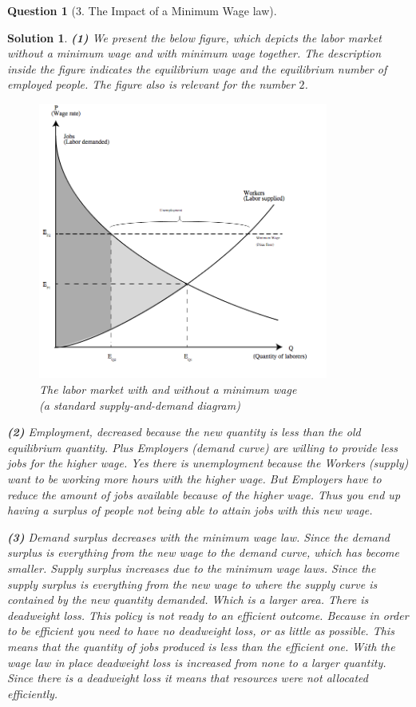 \documentclass{article} %
\theoremstyle{quest}
\newtheorem*{question}{Question}
\newtheorem*{solution}{Solution}
\begin{document}
\pagebreak

\begin{question}[3. The Impact of a Minimum Wage law]
\end{question}
\begin{solution}
\textbf{(1)}
We present the below figure, which depicts the labor market without a minimum wage and with minimum
wage together. The description inside the figure indicates the equilibrium wage and the equilibrium
number of employed people. The figure also is relevant for the number $2$.
\begin{figure}[h!]
  \caption{The labor market with and without a minimum wage \\ (a standard supply-and-demand diagram)}
    \centering
  \includegraphics[width=0.85\textwidth]{graph3.jpg}
\end{figure}
\smallskip

\textbf{(2)}
Employment, decreased because the new quantity is less than the old equilibrium quantity. Plus Employers (demand curve) are willing to provide less jobs for the higher wage. Yes there is unemployment because the Workers (supply) want to be working more hours with the higher wage. But Employers have to reduce the amount of jobs available because of the higher wage. Thus you end up having a surplus of people not being able to attain jobs with this new wage. 

\pagebreak

\textbf{(3)}
Demand surplus decreases with the minimum wage law. Since the demand surplus is everything from the new wage to the demand curve, which has become smaller. Supply surplus increases due to the minimum wage laws. Since the supply surplus is everything from the new wage to where the supply curve is contained by the new quantity demanded. Which is a larger area. There is deadweight loss. This policy is not ready to an efficient outcome. Because in order to be efficient you need to have no deadweight loss, or as little as possible. This means that the quantity of jobs produced is less than the efficient one. With the wage law in place deadweight loss is increased from none to a larger quantity. Since there is a deadweight loss it means that resources were not allocated efficiently.

\end{solution}
\end{document}
